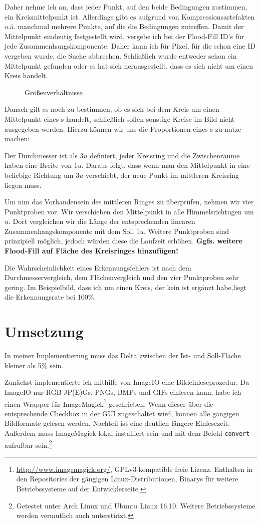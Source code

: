 Daher nehme ich an, dass jeder Punkt, auf den beide Bedingungen zustimmen, ein Kreismittelpunkt ist. Allerdings gibt es aufgrund von Kompressionsartefakten o.ä. manchmal mehrere Punkte, auf die die Bedingungen zutreffen. Damit der Mittelpunkt eindeutig festgestellt wird, vergebe ich bei der Flood-Fill ID's für jede Zusammenhangskomponente. Daher kann ich für Pixel, für die schon eine ID vergeben wurde, die Suche abbrechen. Schließlich wurde entweder schon ein Mittelpunkt gefunden oder es hat sich herausgestellt, dass es sich nicht um einen Kreis handelt.

\begin{figure}
  \centering
  
  \caption{Größenverhältnisse}
\end{figure}
Danach gilt es noch zu bestimmen, ob es sich bei dem Kreis um einen Mittelpunkt eines \task{}s handelt, schließlich sollen sonstige Kreise im Bild nicht ausgegeben werden. Hierzu können wir uns die Proportionen eines \task{}s zu nutze machen:

Der Durchmesser ist als \(3u\) definiert, jeder Kreisring und die Zwischenräume haben eine Breite von \(1u\). Daraus folgt, dass wenn man den Mittelpunkt in eine beliebige Richtung um \(3u\) verschiebt, der neue Punkt im mittleren Kreisring liegen muss.

Um nun das Vorhandensein des mittleren Ringes zu überprüfen, nehmen wir vier Punktproben vor. Wir verschieben den Mittelpunkt in alle Himmelsrichtugen um \(u\). Dort vergleichen wir die Länge der entsprechenden linearen Zusammenhangskomponente mit dem Soll \(1u\). Weitere Punktproben sind prinzipiell möglich, jedoch würden diese die Laufzeit erhöhen. \textbf{Ggfs. weitere Flood-Fill auf Fläche des Kreisringes hinzufügen!}

Die Wahrscheinlichkeit eines Erkennungsfehlers ist nach dem Durchmesservergleich, dem Flächenvergleich und den vier Punktproben sehr gering. Im Beispielbild, dass ich um einen Kreis, der kein \task ist ergänzt habe,liegt die Erkennungsrate bei 100\%.

\pagebreak
\section{Umsetzung}
In meiner Implementierung muss das Delta zwischen der Ist- und Soll-Fläche kleiner als 5\% sein.

Zunächst implementierte ich mithilfe von ImageIO eine Bildeinleseprozedur. Da ImageIO nur RGB-JP(E)Gs, PNGs, BMPs und GIFs einlesen kann, habe ich einen Wrapper für ImageMagick\footnote{\url{http://www.imagemagick.org/}, GPLv3-kompatible freie Lizenz. Enthalten in den Repositories der gängigen Linux-Distributionen, Binarys für weitere Betriebssysteme auf der Entwicklerseite.} geschrieben. Wenn dieser über die entsprechende Checkbox in der GUI zugeschaltet wird, können alle gängigen Bildformate gelesen werden. Nachteil ist eine deutlich längere Einlesezeit. Außerdem muss ImageMagick lokal installiert sein und mit dem Befehl \texttt{convert} aufrufbar sein.\footnote{Getestet unter Arch Linux und Ubuntu Linux 16.10. Weitere Betriebssysteme werden vermutlich auch unterstützt.}

